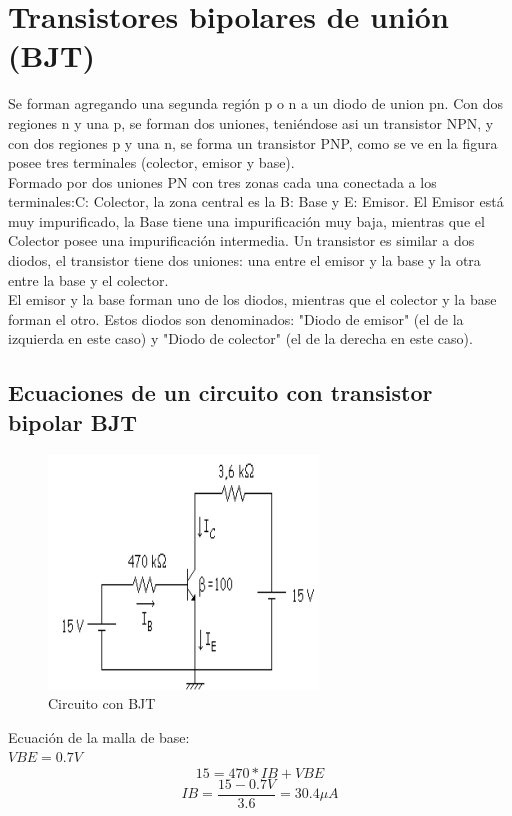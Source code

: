 \documentclass[10pt,a4paper]{article}
\begin{document}
\newpage
\section{Transistores bipolares de unión (BJT)}
Se forman agregando una segunda región p o n a un diodo de union pn. Con dos regiones n y una p, se forman dos uniones, teniéndose asi un transistor NPN, y con dos regiones p  y una n, se forma un transistor PNP, como se ve en la figura posee tres terminales (colector,  emisor y base).\\
Formado por dos uniones PN con tres zonas cada una conectada a los terminales:C: Colector, la zona
central es la B: Base y E: Emisor. El Emisor está muy impurificado, la Base tiene una impurificación
muy baja, mientras que el Colector posee una impurificación intermedia. Un transistor es similar a dos diodos, el transistor tiene dos uniones: una entre el emisor y la base y la otra entre la base y el colector.\\ El emisor y la base forman uno de los diodos, mientras que el colector y la base forman el otro. Estos diodos son denominados: "Diodo de emisor" (el de la izquierda en este caso) y "Diodo de colector" (el de la derecha en este caso). \\

\subsection{Ecuaciones de un circuito con transistor bipolar BJT}
\begin{figure}[hbtp]
\centering
\includegraphics[scale=1]{imagenes/circuito.PNG}
\caption{Circuito con BJT}
\end{figure}

Ecuación de la malla de base:\\
$ VBE = 0.7V $
\begin{equation}
15 = 470*IB + VBE
\end{equation}
\begin{equation}
IB = \frac{15 - 0.7V}{3.6} = 30.4\mu A
\end{equation}
\end{document}
